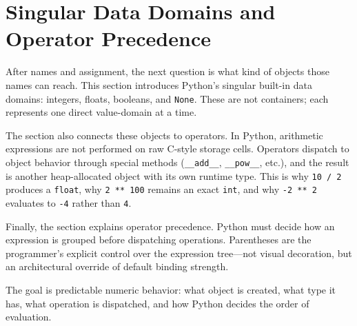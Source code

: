 \section{Singular Data Domains and Operator Precedence}

After names and assignment, the next question is what kind of objects those names can reach. This section introduces Python's singular built-in data domains: integers, floats, booleans, and \texttt{None}. These are not containers; each represents one direct value-domain at a time.

The section also connects these objects to operators. In Python, arithmetic expressions are not performed on raw C-style storage cells. Operators dispatch to object behavior through special methods (\texttt{\_\_add\_\_}, \texttt{\_\_pow\_\_}, etc.), and the result is another heap-allocated object with its own runtime type. This is why \texttt{10 / 2} produces a \texttt{float}, why \texttt{2 ** 100} remains an exact \texttt{int}, and why \texttt{-2 ** 2} evaluates to \texttt{-4} rather than \texttt{4}.

Finally, the section explains operator precedence. Python must decide how an expression is grouped before dispatching operations. Parentheses are the programmer's explicit control over the expression tree---not visual decoration, but an architectural override of default binding strength.

The goal is predictable numeric behavior: what object is created, what type it has, what operation is dispatched, and how Python decides the order of evaluation.
